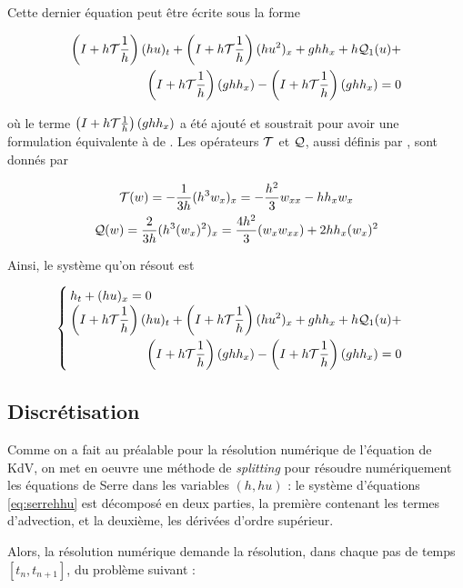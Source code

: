 \indent Cette dernier équation peut être écrite sous la forme

\begin{equation*}
\begin{split}
	\left(I + h\mathcal{T}\frac{1}{h} \right) (hu)_t + \left(I + h\mathcal{T}\frac{1}{h} \right)(hu^2)_x + ghh_x + h\mathcal{Q}_1(u) + \\ \left(I + h\mathcal{T}\frac{1}{h} \right) (ghh_x) - \left(I + h\mathcal{T}\frac{1}{h} \right) (ghh_x) = 0
\end{split}
\end{equation*}

\noindent où le terme $\left(I + h\mathcal{T}\frac{1}{h} \right)(ghh_x)$ a été ajouté et soustrait pour avoir une formulation équivalente à de \cite{Bonneton2011}. Les opérateurs $\mathcal{T}$ et $\mathcal{Q}$, aussi définis par \cite{Bonneton2011}, sont donnés par

\begin{gather*}
	\mathcal{T}(w) = -\frac{1}{3h}(h^3w_x)_x = -\frac{h^2}{3}w_{xx} - hh_xw_x \\
	\mathcal{Q}(w) = \frac{2}{3h}(h^3(w_x)^2  )_x = \frac{4h^2}{3}(w_xw_{xx}) + 2hh_x(w_x)^2
\end{gather*}

\indent Ainsi, le système qu'on résout est 

\begin{equation}
\label{eq:serrehhu}
\begin{cases}
h_t + (hu)_x = 0 \\
\begin{split}
\left(I + h\mathcal{T}\frac{1}{h} \right) (hu)_t + \left(I + h\mathcal{T}\frac{1}{h} \right)(hu^2)_x + ghh_x + h\mathcal{Q}_1(u) + \\ \left(I + h\mathcal{T}\frac{1}{h} \right) (ghh_x) - \left(I + h\mathcal{T}\frac{1}{h} \right) (ghh_x) = 0
\end{split}
\end{cases}
\end{equation}


\subsection{Discrétisation}

\indent Comme on a fait au préalable pour la résolution numérique de l'équation de KdV, on met en oeuvre une méthode de \emph{splitting} pour résoudre numériquement les équations de Serre dans les variables $(h,hu)$ : le système d'équations \eqref{eq:serrehhu} est décomposé en deux parties, la première contenant les termes d'advection, et la deuxième, les dérivées d'ordre supérieur.

\indent Alors, la résolution numérique demande la résolution, dans chaque pas de temps $[t_n, t_{n+1}]$, du problème suivant :

